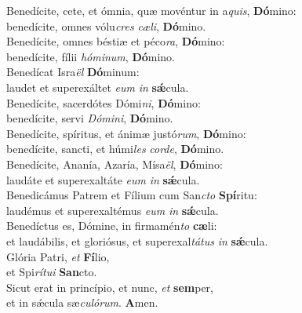 \oddverse Benedícite, cete, et ómnia, quæ movéntur in a\textit{quis}, \textbf{Dó}mino:~\*\\
\oddverse benedícite, omnes vólu\textit{cres} \textit{cæ}\textit{li}, \textbf{Dó}mino.\\
\evenverse Benedícite, omnes béstiæ et péco\textit{ra}, \textbf{Dó}mino:~\*\\
\evenverse benedícite, fílii \textit{hó}\textit{mi}\textit{num}, \textbf{Dó}mino.\\
\oddverse Benedícat Isra\textit{ël} \textbf{Dó}minum:~\*\\
\oddverse laudet et superexáltet \textit{e}\textit{um} \textit{in} \textbf{sǽ}cula.\\
\evenverse Benedícite, sacerdótes Dómi\textit{ni}, \textbf{Dó}mino:~\*\\
\evenverse benedícite, servi \textit{Dó}\textit{mi}\textit{ni}, \textbf{Dó}mino.\\
\oddverse Benedícite, spíritus, et ánimæ justó\textit{rum}, \textbf{Dó}mino:~\*\\
\oddverse benedícite, sancti, et húmi\textit{les} \textit{cor}\textit{de}, \textbf{Dó}mino.\\
\evenverse Benedícite, Ananía, Azaría, Mísa\textit{ël}, \textbf{Dó}mino:~\*\\
\evenverse laudáte et superexaltáte \textit{e}\textit{um} \textit{in} \textbf{sǽ}cula.\\
\oddverse Benedicámus Patrem et Fílium cum San\textit{cto} \textbf{Spí}ritu:~\*\\
\oddverse laudémus et superexaltémus \textit{e}\textit{um} \textit{in} \textbf{sǽ}cula.\\
\evenverse Benedíctus es, Dómine, in firmamén\textit{to} \textbf{cæ}li:~\*\\
\evenverse et laudábilis, et gloriósus, et superexal\textit{tá}\textit{tus} \textit{in} \textbf{sǽ}cula.\\
\oddverse Glória Patri, \textit{et} \textbf{Fí}lio,~\*\\
\oddverse et Spi\textit{rí}\textit{tu}\textit{i} \textbf{San}cto.\\
\evenverse Sicut erat in princípio, et nunc, \textit{et} \textbf{sem}per,~\*\\
\evenverse et in sǽcula sæ\textit{cu}\textit{ló}\textit{rum}. \textbf{A}men.\\
